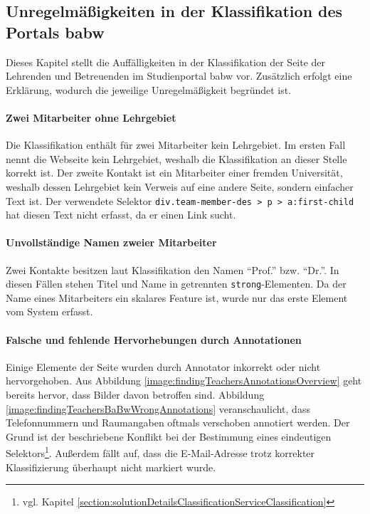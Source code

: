 \subsection{Unregelmäßigkeiten in der Klassifikation des Portals \acrshort{babw}}
    \label{section:findingsTeachersAbnormalitiesBabw}
    Dieses Kapitel stellt die Auffälligkeiten in der Klassifikation
    der Seite der Lehrenden und Betreuenden im Studienportal
    \gls{babw} vor.
    Zusätzlich erfolgt eine Erklärung,
    wodurch die jeweilige Unregelmäßigkeit begründet ist.

    \paragraph*{Zwei Mitarbeiter ohne Lehrgebiet}
    Die Klassifikation enthält für zwei Mitarbeiter kein Lehrgebiet.
    Im ersten Fall nennt die Webseite kein Lehrgebiet,
    weshalb die Klassifikation an dieser Stelle korrekt ist.
    Der zweite Kontakt ist ein Mitarbeiter einer fremden Universität,
    weshalb dessen Lehrgebiet kein Verweis auf eine andere Seite,
    sondern einfacher Text ist.
    Der verwendete Selektor \texttt{div.team-member-des > p > a:first-child}
    hat diesen Text nicht erfasst, da er einen Link sucht.

    \paragraph*{Unvollständige Namen zweier Mitarbeiter}
    Zwei Kontakte besitzen laut Klassifikation den Namen "`Prof."' bzw. "`Dr."'.
    In diesen Fällen stehen Titel und Name in getrennten \texttt{strong}-Elementen.
    Da der Name eines Mitarbeiters ein skalares Feature ist,
    wurde nur das erste Element vom System erfasst.

    \paragraph*{Falsche und fehlende Hervorhebungen durch Annotationen}
    Einige Elemente der Seite wurden durch Annotator inkorrekt oder nicht hervorgehoben.
    Aus Abbildung \ref{image:findingTeachersAnnotationsOverview} geht bereits hervor,
    dass Bilder davon betroffen sind.
    Abbildung \ref{image:findingTeachersBaBwWrongAnnotations}
    veranschaulicht, dass Telefonnummern und Raumangaben oftmals verschoben annotiert werden.
    Der Grund ist der
    beschriebene Konflikt bei der Bestimmung eines eindeutigen
    Selektors\footnote{vgl. Kapitel \ref{section:solutionDetailsClassificationServiceClassification}}.
    Außerdem fällt auf, dass die E-Mail-Adresse trotz korrekter Klassifizierung
    überhaupt nicht markiert wurde.

